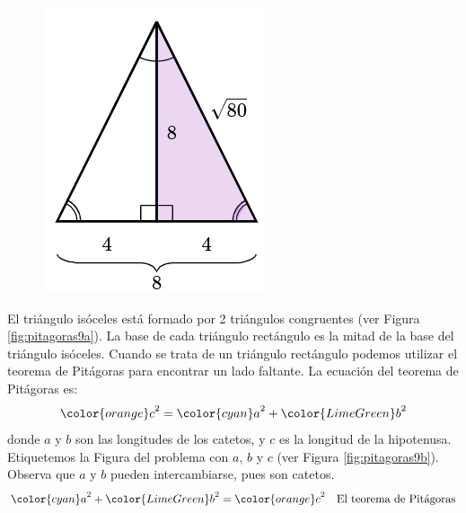 \begin{solutionbox}{14cm}
\begin{minipage}{0.2\textwidth}
\begin{figure}[H]
        \end{figure}
        \begin{figure}[H]
            \centering
            \includegraphics[width=0.75\linewidth]{../images/pitagoras9c.png}
            \caption{}
            \label{fig:pitagoras9c}
        \end{figure}
    \end{minipage}\hfill
    \begin{minipage}{0.75\textwidth}
        El triángulo isóceles está formado por 2 triángulos congruentes (ver Figura \ref{fig:pitagoras9a}).
        La base de cada triángulo rectángulo es la mitad de la base del triángulo isóceles.
        Cuando se trata de un triángulo rectángulo podemos utilizar el teorema de Pitágoras para encontrar un lado faltante.
        La ecuación del teorema de Pitágoras es:
        \[{\color{orange}c}^2={\color{cyan}a}^2+{\color{LimeGreen}b}^2\]
        donde $a$ y $b$ son las longitudes de los catetos, y $c$ es la longitud de la hipotenusa.
        Etiquetemos la Figura del problema con $a$, $b$ y $c$ (ver Figura \ref{fig:pitagoras9b}).
        Observa que $a$ y $b$ pueden intercambiarse, pues son catetos.
        \begin{align*}
            {\color{cyan}a}^2+{\color{LimeGreen}b}^2  ={\color{orange}c}^2         & \text{\quad El teorema de Pitágoras}                          \\

\end{align*}
\end{minipage}
\end{solutionbox}
